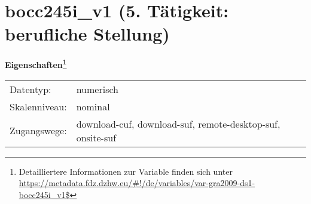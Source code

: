 
    \setcounter{footnote}{0}

    \vspace*{-1.8cm}
	\section{bocc245i\_v1 (5. Tätigkeit: berufliche Stellung)}
	\label{section:bocc245i_v1}



    \vspace*{0.5cm}
    \noindent\textbf{Eigenschaften\footnote{Detailliertere Informationen zur Variable finden sich unter
		\url{https://metadata.fdz.dzhw.eu/\#!/de/variables/var-gra2009-ds1-bocc245i_v1$}}}\\
	\begin{tabularx}{\hsize}{@{}lX}
	Datentyp: & numerisch \\
	Skalenniveau: & nominal \\
	Zugangswege: &
	  download-cuf, 
	  download-suf, 
	  remote-desktop-suf, 
	  onsite-suf
 \\
    \end{tabularx}



